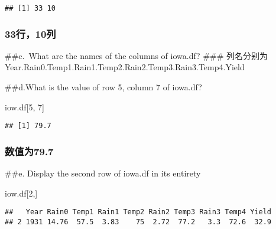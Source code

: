 \documentclass[
]{article}
\newenvironment{Shaded}{\begin{snugshade}}{\end{snugshade}}
\newcommand{\DecValTok}[1]{\textcolor[rgb]{0.00,0.00,0.81}{#1}}
\newcommand{\NormalTok}[1]{#1}
\begin{document}
\begin{verbatim}
## [1] 33 10
\end{verbatim}

\hypertarget{ux884c10ux5217}{%
\subsubsection{33行，10列}\label{ux884c10ux5217}}

\#\#c.~What are the names of the columns of iowa.df? \#\#\#
列名分别为Year.Rain0.Temp1.Rain1.Temp2.Rain2.Temp3.Rain3.Temp4.Yield

\#\#d.What is the value of row 5, column 7 of iowa.df?

\begin{Shaded}
\begin{Highlighting}[]
\NormalTok{iow.df[}\DecValTok{5}\NormalTok{, }\DecValTok{7}\NormalTok{]}
\end{Highlighting}
\end{Shaded}

\begin{verbatim}
## [1] 79.7
\end{verbatim}

\hypertarget{ux6570ux503cux4e3a79.7}{%
\subsubsection{数值为79.7}\label{ux6570ux503cux4e3a79.7}}

\#\#e. Display the second row of iowa.df in its entirety

\begin{Shaded}
\begin{Highlighting}[]
\NormalTok{iow.df[}\DecValTok{2}\NormalTok{,]}
\end{Highlighting}
\end{Shaded}

\begin{verbatim}
##   Year Rain0 Temp1 Rain1 Temp2 Rain2 Temp3 Rain3 Temp4 Yield
## 2 1931 14.76  57.5  3.83    75  2.72  77.2   3.3  72.6  32.9
\end{verbatim}
\end{document}
